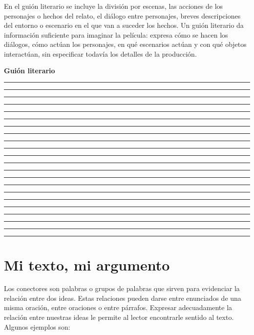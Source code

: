 \documentclass[11pt,fleqn,twocolumn]{book} %
\begin{document}
\begin{exercise}
\begin{itemize}
\begin{itemize}
\end{itemize}

\end{itemize}
\end{exercise}


\begin{corollary}
En el guión literario se incluye la división por escenas, las acciones de los personajes o hechos del relato, el diálogo entre personajes, breves descripciones del entorno o escenario en el que van a suceder los hechos. Un guión literario da información suficiente para imaginar la película: expresa cómo se hacen los diálogos, cómo actúan los personajes, en qué escenarios actúan y con qué objetos interactúan, sin especificar todavía los detalles de la producción. 
\end{corollary}


\textbf{Guión literario} \\
\rule[-0.2mm]{76mm}{0.1mm}
\rule[-0.2mm]{76mm}{0.1mm}
\rule[-0.2mm]{76mm}{0.1mm}
\rule[-0.2mm]{76mm}{0.1mm}
\rule[-0.2mm]{76mm}{0.1mm}
\rule[-0.2mm]{76mm}{0.1mm}
\rule[-0.2mm]{76mm}{0.1mm}
\rule[-0.2mm]{76mm}{0.1mm}
\rule[-0.2mm]{76mm}{0.1mm}
\rule[-0.2mm]{76mm}{0.1mm}
\rule[-0.2mm]{76mm}{0.1mm}
\rule[-0.2mm]{76mm}{0.1mm}
\rule[-0.2mm]{76mm}{0.1mm}
\rule[-0.2mm]{76mm}{0.1mm}
\rule[-0.2mm]{76mm}{0.1mm}
\rule[-0.2mm]{76mm}{0.1mm}
\rule[-0.2mm]{76mm}{0.1mm}
\rule[-0.2mm]{76mm}{0.1mm}
\rule[-0.2mm]{76mm}{0.1mm}
\rule[-0.2mm]{76mm}{0.1mm}
\rule[-0.2mm]{76mm}{0.1mm}
\rule[-0.2mm]{76mm}{0.1mm}
\vspace{2em}




\section{Mi texto, mi argumento}
\begin{definition}
Los conectores son palabras o grupos de palabras que sirven para evidenciar la relación entre dos ideas. Estas relaciones pueden darse entre enunciados de una misma oración, entre oraciones o entre párrafos. Expresar adecuadamente la relación entre nuestras ideas le permite al lector encontrarle sentido al texto. Algunos ejemplos son:  
\end{definition}
\end{document}

